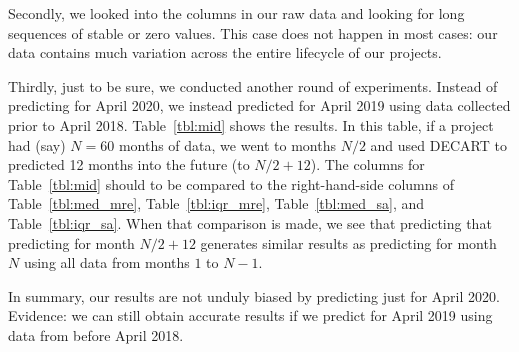 \documentclass[sigconf,review,anonymous]{acmart}
\begin{document}
Secondly, we looked into the columns in our raw data and looking for long sequences of stable or zero values. This case does not happen in most cases: our data contains much variation across the entire lifecycle of our projects.

Thirdly, just to be sure, we conducted another round of experiments. Instead of predicting for April 2020, we instead predicted for April 2019 using
data collected prior to April 2018.
 Table~\ref{tbl:mid} shows the results. In this table, if a project had (say) $N=60$ months of data, we went to months $N/2$ and used DECART to predicted 12 months into the future (to $N/2+12$). The columns for Table~\ref{tbl:mid}  should  to be compared to the right-hand-side columns of Table~\ref{tbl:med_mre}, Table~\ref{tbl:iqr_mre},  Table~\ref{tbl:med_sa}, and Table~\ref{tbl:iqr_sa}. When that comparison is made, we see that predicting that predicting for month $N/2+12$ generates similar results as predicting for  month $N$ using all data from months  $1$ to $N-1$. 
 
 In summary,
our results are not unduly biased by predicting just for April 2020. Evidence: we can still obtain accurate results
if we predict for April 2019 using data from before April 2018.
\end{document}
